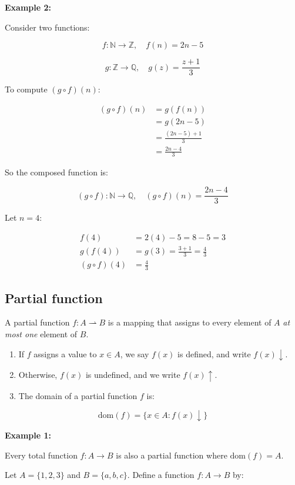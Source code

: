 \documentclass[12pt,a4paper,openany]{article}
\begin{document}
\textbf{Example 2:}

Consider two functions:

\[
f: \mathbb{N} \to \mathbb{Z}, \quad f(n) = 2n - 5
\]

\[
g: \mathbb{Z} \to \mathbb{Q}, \quad g(z) = \displaystyle\frac{z + 1}{3}
\]

To compute $(g \circ f)(n)$:

\[
\begin{aligned}
(g \circ f)(n) &= g(f(n)) \\
&= g(2n - 5) \\
&= \frac{(2n - 5) + 1}{3} \\
&= \frac{2n - 4}{3}
\end{aligned}
\]

So the composed function is:

\[
(g \circ f): \mathbb{N} \to \mathbb{Q}, \quad (g \circ f)(n) = \displaystyle\frac{2n - 4}{3}
\]

Let $n = 4$:

\[
\begin{aligned}
f(4) &= 2(4) - 5 = 8 - 5 = 3 \\
g(f(4)) &= g(3) = \frac{3 + 1}{3} = \frac{4}{3} \\
(g \circ f)(4) &= \frac{4}{3}
\end{aligned}
\]

\subsection{Partial function}

A partial function $f : A \rightharpoonup B$ is a mapping that assigns to every element of $A$ \textit{at most one} element of $B$.

\begin{enumerate}
  \item If $f$ assigns a value to $x \in A$, we say $f(x)$ is defined, and write $f(x) \downarrow$.
  \item Otherwise, $f(x)$ is undefined, and we write $f(x) \uparrow$.
  \item The domain of a partial function $f$ is:
\end{enumerate}


\[\text{dom}(f) = \{x \in A : f(x) \downarrow\}\]

\textbf{Example 1:}

Every total function $f : A \to B$ is also a partial function where $\text{dom}(f) = A$.

Let $A = \{1, 2, 3\}$ and $B = \{a, b, c\}$. Define a function $f : A \to B$ by:
\end{document}
